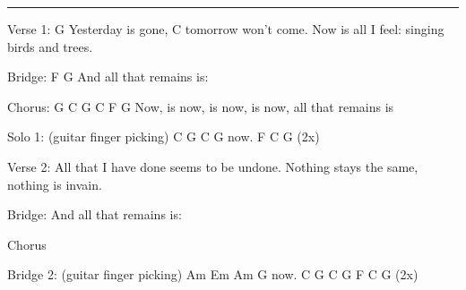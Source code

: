 \noindent\rule{\columnwidth}{1pt}

\begin{lstsong}
Verse 1:
G
Yesterday is gone,
C
tomorrow won't come.
Now is all I feel:
singing birds and trees.

Bridge:
F            G
And all that remains is:

Chorus:
G       C       G       C             F       G
Now, is now, is now, is now, all that remains is

Solo 1: (guitar finger picking)
C    G   C   G
now.
F C G (2x)

Verse 2:
All that I have done
seems to be undone.
Nothing stays the same,
nothing is invain.

Bridge:
And all that remains is:

Chorus

Bridge 2: (guitar finger picking)
Am     Em   Am  G
now.
C   G   C   G
F  C  G (2x)
\end{lstsong}
\newpage
